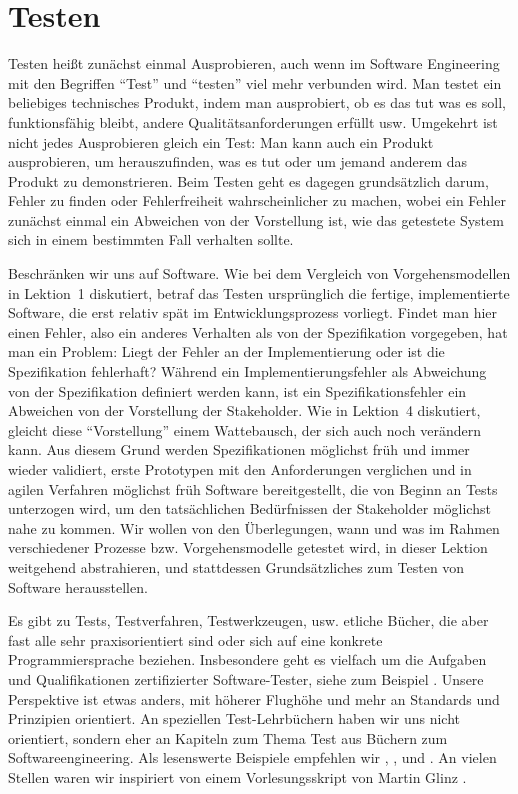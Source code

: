 \section{Testen}
\label{sec:Kap-11-1}

Testen heißt zunächst einmal Ausprobieren, auch wenn im Software Engineering mit den Begriffen "`Test"' und "`testen"' viel mehr verbunden wird. Man testet ein beliebiges technisches Produkt, indem man ausprobiert, ob es das tut was es soll, funktionsfähig bleibt, andere Qualitätsanforderungen erfüllt usw. Umgekehrt ist nicht jedes Ausprobieren gleich ein Test: Man kann auch ein Produkt ausprobieren, um herauszufinden, was es tut oder um jemand anderem das Produkt zu demonstrieren. Beim Testen geht es dagegen grundsätzlich darum, Fehler zu finden oder Fehler\-freiheit wahrscheinlicher zu machen, wobei ein Fehler zunächst einmal ein Abweichen von der Vorstellung ist, wie das getestete System sich in einem bestimmten Fall verhalten sollte.

Beschränken wir uns auf Software. Wie bei dem Vergleich von Vorgehensmodellen in Lektion~1 %
diskutiert, betraf das Testen ursprünglich die fertige, implementierte Software, die erst relativ spät im Entwicklungsprozess vorliegt. Findet man hier einen Fehler, also ein anderes Verhalten als von der Spezifikation vorgegeben, hat man ein Problem: Liegt der Fehler an der Implementierung oder ist die Spezifikation fehlerhaft? Während ein Implementierungsfehler als Abweichung von der Spezifikation definiert werden kann, ist ein Spezifikationsfehler ein Abweichen von der Vorstellung der Stakeholder. Wie in Lektion~4 %
diskutiert, gleicht diese "`Vorstellung"' einem Wattebausch, der sich auch noch verändern kann. Aus diesem Grund werden Spezifikationen möglichst früh und immer wieder validiert, erste Prototypen mit den Anforderungen verglichen und in agilen Verfahren möglichst früh Software bereitgestellt, die von Beginn an Tests unterzogen wird, um den tatsächlichen Bedürfnissen der Stakeholder möglichst nahe zu kommen.
Wir wollen von den Überlegungen, wann und was im Rahmen verschiedener Prozesse bzw. Vorgehensmodelle getestet wird, in dieser Lektion weitgehend abstrahieren, und stattdessen Grundsätzliches zum Testen von Software herausstellen.

Es gibt zu Tests, Testverfahren, Testwerkzeugen, usw. etliche Bücher, die aber fast alle sehr praxisorientiert sind oder sich auf eine konkrete Programmiersprache beziehen. Insbesondere geht es vielfach um die Aufgaben und Qualifikationen zertifizierter Software-Tester, siehe zum Beispiel \cite{spi19}. Unsere Perspektive ist etwas anders, mit höherer Flughöhe und mehr an Standards und Prinzipien orientiert. An speziellen Test-Lehrbüchern haben wir uns nicht orientiert, sondern eher an Kapiteln zum Thema Test aus Büchern zum Softwareengineering. Als lesenswerte Beispiele empfehlen wir \cite{bal11}, \cite{lig09}, \cite{zel09} und \cite{lud23}. An vielen Stellen waren wir inspiriert von einem Vorlesungsskript von Martin Glinz \cite{gli05}.